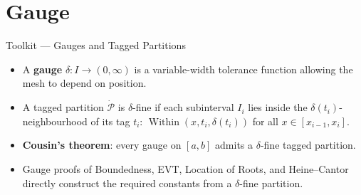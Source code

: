 
\section{Gauge}

\begin{toolkitbox}{Toolkit --- Gauges and Tagged Partitions}
\begin{itemize}
  \item A \textbf{gauge} $\delta:I\to(0,\infty)$ is a variable-width
    tolerance function allowing the mesh to depend on position.
  \item A tagged partition $\dot{\mathcal{P}}$ is $\delta$-fine if
    each subinterval $I_i$ lies inside the $\delta(t_i)$-neighbourhood
    of its tag $t_i$: $\operatorname{Within}(x,t_i,\delta(t_i))$ for
    all $x\in[x_{i-1},x_i]$.
  \item \textbf{Cousin's theorem}: every gauge on $[a,b]$ admits a
    $\delta$-fine tagged partition.
  \item Gauge proofs of Boundedness, EVT, Location of Roots, and
    Heine--Cantor directly construct the required constants from a
    $\delta$-fine partition.
\end{itemize}
\end{toolkitbox}




